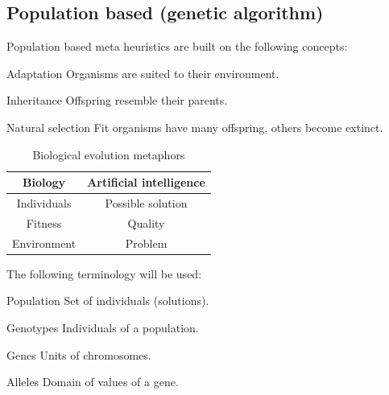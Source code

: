 \subsection{Population based (genetic algorithm)}

Population based meta heuristics are built on the following concepts:
\begin{descriptionlist}
    \item[Adaptation] Organisms are suited to their environment.
    \item[Inheritance] Offspring resemble their parents.
    \item[Natural selection] Fit organisms have many offspring, others become extinct.
\end{descriptionlist}

\begin{table}[ht]
    \centering
    \begin{tabular}{c | c}
        \textbf{Biology} & \textbf{Artificial intelligence} \\
        \hline
        Individuals & Possible solution \\
        Fitness & Quality \\
        Environment & Problem \\
    \end{tabular}
    \caption{Biological evolution metaphors}
\end{table}

The following terminology will be used:
\begin{descriptionlist}
    \item[Population] Set of individuals (solutions).
    \item[Genotypes] Individuals of a population.
    \item[Genes] Units of chromosomes.
    \item[Alleles] Domain of values of a gene.
\end{descriptionlist}

